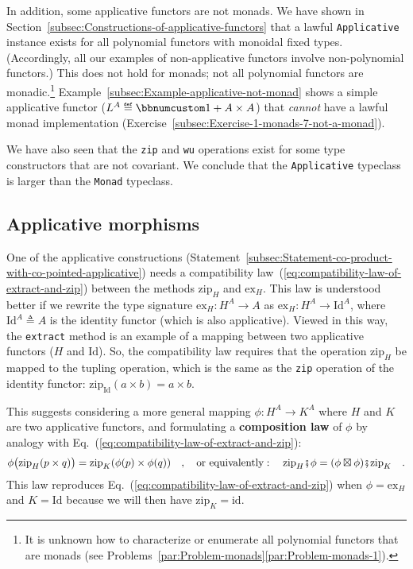 In addition, some applicative functors are not monads. We have shown
in Section~\ref{subsec:Constructions-of-applicative-functors} that
a lawful \lstinline!Applicative! instance exists for all polynomial
functors with monoidal fixed types. (Accordingly, all our examples
of non-applicative functors involve non-polynomial functors.) This
does not hold for monads; not all polynomial functors are monadic.\footnote{It is unknown how to characterize or enumerate all polynomial functors
that are monads (see Problems~\ref{par:Problem-monads}\textendash \ref{par:Problem-monads-1}).} Example~\ref{subsec:Example-applicative-not-monad} shows a simple
applicative functor ($L^{A}\triangleq\bbnum 1+A\times A$) that \emph{cannot}
have a lawful monad implementation (Exercise~\ref{subsec:Exercise-1-monads-7-not-a-monad}).

We have also seen that the \lstinline!zip! and \lstinline!wu! operations
exist for some type constructors that are not covariant. We conclude
that the \lstinline!Applicative! typeclass is larger than the \lstinline!Monad!
typeclass.

\subsection{Applicative morphisms}

One of the applicative constructions (Statement~\ref{subsec:Statement-co-product-with-co-pointed-applicative})
needs a compatibility law~(\ref{eq:compatibility-law-of-extract-and-zip})
between the methods $\text{zip}_{H}$ and $\text{ex}_{H}$. This law
is understood better if we rewrite the type signature $\text{ex}_{H}:H^{A}\rightarrow A$
as $\text{ex}_{H}:H^{A}\rightarrow\text{Id}^{A}$, where $\text{Id}^{A}\triangleq A$
is the identity functor (which is also applicative). Viewed in this
way, the \lstinline!extract! method is an example of a mapping between
two applicative functors ($H$ and $\text{Id}$). So, the compatibility
law requires that the operation $\text{zip}_{H}$ be mapped to the
tupling operation, which is the same as the \lstinline!zip! operation
of the identity functor: $\text{zip}_{\text{Id}}(a\times b)=a\times b$.

This suggests considering a more general mapping $\phi:H^{A}\rightarrow K^{A}$
where $H$ and $K$ are two applicative functors, and formulating
a \textbf{composition law}
of $\phi$ by analogy with Eq.~(\ref{eq:compatibility-law-of-extract-and-zip}):
\[
\phi\big(\text{zip}_{H}(p\times q)\big)=\text{zip}_{K}(\phi(p)\times\phi(q))\quad,\quad\text{or equivalently}:\quad\text{zip}_{H}\bef\phi=(\phi\boxtimes\phi)\bef\text{zip}_{K}\quad.
\]
This law reproduces Eq.~(\ref{eq:compatibility-law-of-extract-and-zip})
when $\phi=\text{ex}_{H}$ and $K=\text{Id}$ because we will then
have $\text{zip}_{K}=\text{id}$. 

